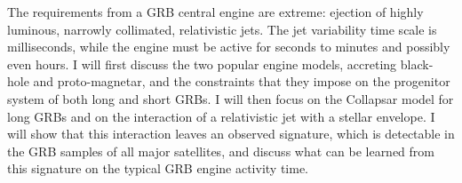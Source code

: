 


\bigskip



\bigskip

\noindent The requirements from a GRB central engine are extreme: ejection of highly luminous, narrowly collimated, relativistic jets. The jet variability time scale is milliseconds, while the engine must be active for seconds to minutes and possibly even hours. I will first discuss the two popular engine models, accreting black-hole and proto-magnetar, and the constraints that they impose on the progenitor system of both long and short GRBs.  I will then focus on the Collapsar model for long GRBs and on the interaction of a relativistic jet with a stellar envelope. I will show that this interaction leaves an observed signature, which is detectable in the GRB samples of all major satellites, and discuss what can be learned from this signature on the typical GRB engine activity time.

